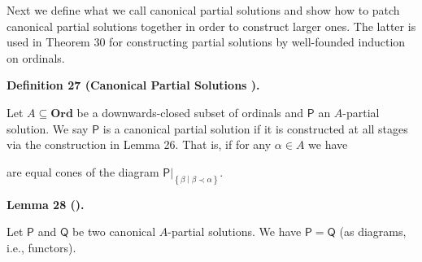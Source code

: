  
Next we define what we call canonical partial solutions and show how to patch canonical partial solutions together in order to construct larger ones. The latter is used in Theorem 30 for constructing partial solutions by well-founded induction on ordinals.\par
 
 
 
\par\medskip\noindent\textbf{Definition 27 (Canonical Partial Solutions ).}\par
 
 
Let $A\subseteq\mathbf{Ord}$ be a downwards-closed subset of ordinals and $\boldsymbol{\mathsf{P}}$ an $A$-partial solution. We say $\boldsymbol{\mathsf{P}}$ is a canonical partial solution if it is constructed at all stages via the construction in Lemma 26. That is, if for any $\alpha\in A$ we have\par
 
\begin{center}\end{center}
 
are equal cones of the diagram ${\left.\boldsymbol{\mathsf{P}}\right|}_{\left\{\beta\middle|\beta\prec\alpha\right\}}$.\par
 
 
 
 
\par\medskip\noindent\textbf{Lemma 28 ().}\par
 
 
Let $\boldsymbol{\mathsf{P}}$ and $\boldsymbol{\mathsf{Q}}$ be two canonical $A$-partial solutions. We have $\boldsymbol{\mathsf{P}}=\boldsymbol{\mathsf{Q}}$ (as diagrams, i.e., functors).\par
 
